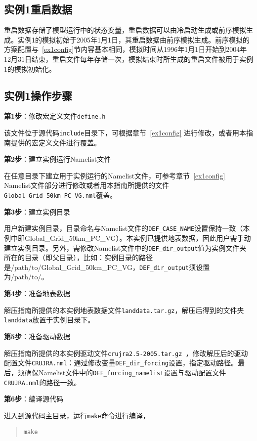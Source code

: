 \subsection{实例1重启数据}

重启数据存储了模型运行中的状态变量，重启数据可以由冷启动生成或前序模拟生成。实例1的模拟初始于2005年1月1日，其重启数据由前序模拟生成。前序模拟的方案配置与~\ref{ex1config}节内容基本相同，模拟时间从1996年1月1日开始到2004年12月31日结束，重启文件每年存储一次，模拟结束时所生成的重启文件被用于实例1的模拟初始化。

\subsection{实例1操作步骤}

\textbf{第1步}：修改宏定义文件\texttt{define.h}

该文件位于源代码\texttt{include}目录下，可根据章节~\ref{ex1config} 进行修改，或者用本指南提供的宏定义文件进行覆盖。

\bigskip
\textbf{第2步}：建立实例运行Namelist文件

在任意目录下建立用于实例运行的Namelist文件，可参考章节~\ref{ex1config} Namelist文件部分进行修改或者用本指南所提供的文件\texttt{Global\_Grid\_50km\_PC\_VG.nml}覆盖。

\bigskip
\textbf{第3步}：建立实例目录

用户新建实例目录，目录命名与Namelist文件的\texttt{DEF\_CASE\_NAME}设置保持一致（本例中即Global\_Grid\_50km\_PC\_VG）。本实例已提供地表数据，因此用户需手动建立实例目录。另外，需修改Namelist文件中的\texttt{DEF\_dir\_output}值为实例文件夹所在的目录（即父目录），比如：实例目录的路径是/path/to/Global\_Grid\_50km\_PC\_VG，\texttt{DEF\_dir\_output}须设置为/path/to/。

\bigskip
\textbf{第4步}：准备地表数据

解压指南所提供的本实例地表数据文件\texttt{landdata.tar.gz}，解压后得到的文件夹\texttt{landdata}放置于实例目录下。

\bigskip
\textbf{第5步}：准备驱动数据

解压指南所提供的本实例驱动文件\texttt{crujra2.5-2005.tar.gz }，修改解压后的驱动配置文件\texttt{CRUJRA.nml}：通过修改变量\texttt{DEF\_dir\_forcing}设置，指定驱动路径。最后，须确保Namelist文件中的\texttt{DEF\_forcing\_namelist}设置与驱动配置文件\texttt{CRUJRA.nml}的路径一致。

\bigskip
\textbf{第6步}：编译源代码

进入到源代码主目录，运行\texttt{make}命令进行编译，
\begin{quote}
\begin{lstlisting}
make
\end{lstlisting}
\end{quote}

